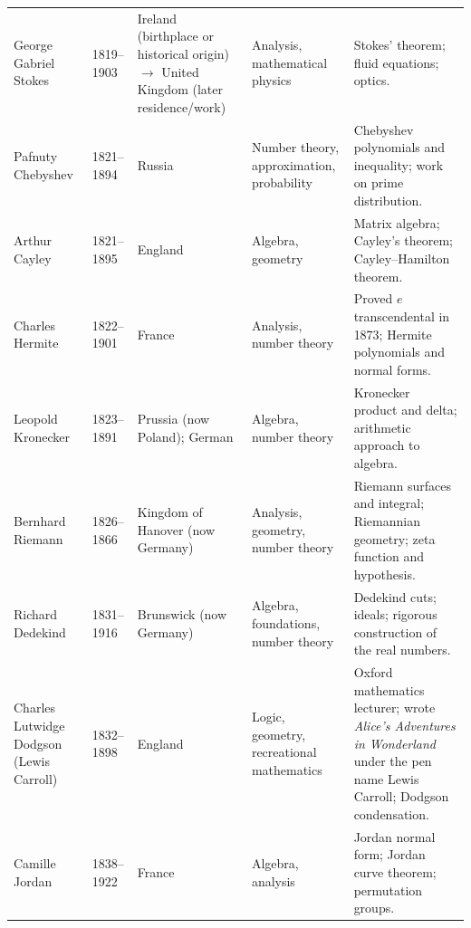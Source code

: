 {\begin{longtable}{@{}L{0.145\textwidth}L{0.09\textwidth}L{0.225\textwidth}L{0.14\textwidth}L{0.30\textwidth}@{}}
        George Gabriel Stokes
        & 1819--1903
        & Ireland (birthplace or historical origin) \(\to\) United Kingdom (later residence/work)
        & Analysis, mathematical physics
        & Stokes' theorem; fluid equations; optics. \\

        Pafnuty Chebyshev
        & 1821--1894
        & Russia
        & Number theory, approximation, probability
        & Chebyshev polynomials and inequality; work on prime distribution. \\

        Arthur Cayley
        & 1821--1895
        & England
        & Algebra, geometry
        & Matrix algebra; Cayley's theorem; Cayley--Hamilton theorem. \\

        Charles Hermite
        & 1822--1901
        & France
        & Analysis, number theory
        & Proved $e$ transcendental in 1873; Hermite polynomials and normal
          forms. \\

        Leopold Kronecker
        & 1823--1891
        & Prussia (now Poland); German
        & Algebra, number theory
        & Kronecker product and delta; arithmetic approach to algebra. \\

        Bernhard Riemann
        & 1826--1866
        & Kingdom of Hanover (now Germany)
        & Analysis, geometry, number theory
        & Riemann surfaces and integral; Riemannian geometry; zeta function and
          hypothesis. \\

        Richard Dedekind
        & 1831--1916
        & Brunswick (now Germany)
        & Algebra, foundations, number theory
        & Dedekind cuts; ideals; rigorous construction of the real numbers. \\

        Charles Lutwidge Dodgson (Lewis Carroll)
        & 1832--1898
        & England
        & Logic, geometry, recreational mathematics
        & Oxford mathematics lecturer; wrote
          \textit{Alice's Adventures in Wonderland} under the pen name Lewis
          Carroll; Dodgson condensation. \\

        Camille Jordan
        & 1838--1922
        & France
        & Algebra, analysis
        & Jordan normal form; Jordan curve theorem; permutation groups. \\


\end{longtable}}
